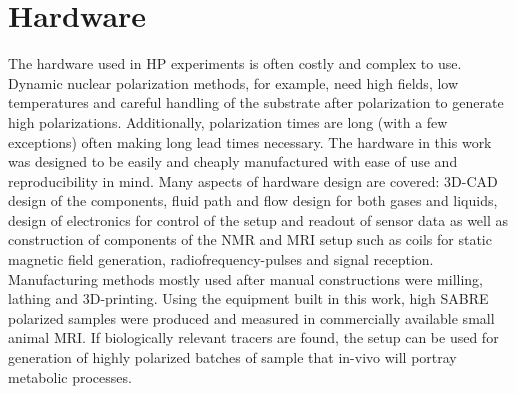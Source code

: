     \section{Hardware}
    The hardware used in HP experiments is often costly and complex to use. Dynamic nuclear polarization methods, for example, need high fields, low temperatures and careful handling of the substrate after polarization to generate high polarizations\cite{ardenkjaer-larsen_present_2016, milani_magnetic_2015,}. Additionally, polarization times are long (with a few exceptions) often making long lead times necessary. The hardware in this work was designed to be easily and cheaply manufactured with ease of use and reproducibility in mind. Many aspects of hardware design are covered: 3D-CAD design of the components, fluid path and flow design for both gases and liquids, design of electronics for control of the setup and readout of sensor data as well as construction of components of the NMR and MRI setup such as coils for static magnetic field generation, radiofrequency-pulses and signal reception. Manufacturing methods mostly used after manual constructions were milling, lathing and 3D-printing. Using the equipment built in this work, high SABRE polarized samples were produced and measured in commercially available small animal MRI. If biologically relevant tracers are found, the setup can be used for generation of highly polarized batches of sample that in-vivo will portray metabolic processes.
